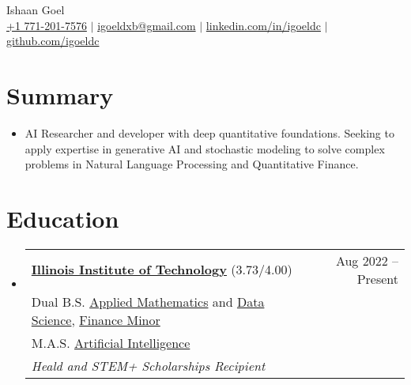 \documentclass[letterpaper,10pt]{article}
\newcommand\indentsize{10pt}
\newcommand\vspacesize{-10pt}
\newcommand{\resumeSubHeadingListStart}{\begin{itemize}[leftmargin=0.15in, label=]}
\newcommand{\resumeSubHeadingListEnd}{\end{itemize}}
\begin{document}
\begin{center}
    \huge Ishaan Goel \\ \vspace{2pt}
    \large
    \href{tel:17712017576}{+1 771-201-7576}
    $|$ \href{mailto:igoeldxb@gmail.com}{igoeldxb@gmail.com}
    $|$ \href{https://linkedin.com/in/igoeldc/}{linkedin.com/in/igoeldc}
    $|$ \href{https://github.com/igoeldc}{github.com/igoeldc}
\end{center}

\section{Summary}
  \resumeSubHeadingListStart
    \item{AI Researcher and developer with deep quantitative foundations. Seeking to apply expertise in generative AI and stochastic modeling to solve complex problems in Natural Language Processing and Quantitative Finance.}
  \resumeSubHeadingListEnd
\vspace{\vspacesize}

\newcommand{\resumeEducationHeading}[6]{
  \item
    \begin{tabular*}{0.97\textwidth}[t]{l@{\extracolsep{\fill}}r}
      \textbf{#1} {#2} & #3 \\
      \hspace{\indentsize} #4 \\
      \hspace{\indentsize} #5 \\
      \hspace{20pt} \textit{#6} \\
    \end{tabular*}
}

\section{Education}
  \resumeSubHeadingListStart
    \resumeEducationHeading
      {\href{https://www.iit.edu/}{Illinois Institute of Technology}}{(3.73/4.00)}{Aug 2022 -- Present}{Dual B.S. \href{https://catalog.iit.edu/undergraduate/colleges/computing/applied-mathematics/bs/\#text}{Applied Mathematics} and \href{https://catalog.iit.edu/undergraduate/colleges/computing/computer-science/\#:~:text=The\%20B.S.\%20in\%20Data,be\%20successful\%20data\%20science\%20professionals.}{Data Science}, \href{https://catalog.iit.edu/undergraduate/colleges/business/minor-finance/\#:~:text=business\%20schools\%20worldwide.-,Required\%20Courses,-Course\%20List}{Finance Minor}}
      {M.A.S. \href{https://catalog.iit.edu/graduate/colleges/computing/computer-science/master-artificial-intelligence/\#overviewtext}{Artificial Intelligence}}{Heald and STEM+ Scholarships Recipient}
  \resumeSubHeadingListEnd
  
\end{document}
